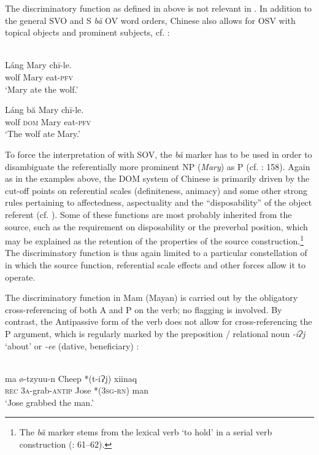 \documentclass[output=paper]{langsci/langscibook}
\begin{document}
The discriminatory function as defined in  above is not relevant in . In addition to the general SVO and S \textit{bă} OV word orders, Chinese also allows for OSV with topical objects and prominent subjects, cf. :

\ea\label{ex:serzant:21}
\\
\ea
\gll Láng   Mary   chī-le.\\
     wolf  Mary  eat-\textsc{pfv}\\
\glt ‘Mary ate the wolf.’

\ex
\gll Láng bă   Mary   chī-le.\\
     wolf \textsc{dom}   Mary  eat-\textsc{pfv}\\
\glt ‘The wolf ate Mary.’
\z
\z

To force the interpretation of  with SOV, the \textit{bă} marker has to be used in order to disambiguate the referentially more prominent NP (\textit{Mary}) as P (cf. \citealt{Bisang1992}: 158). Again as in the examples above, the DOM system of Chinese is primarily driven by the cut-off points on referential scales (definiteness, animacy) and some other strong rules pertaining to affectedness, aspectuality and the “disposability” of the object referent (cf. \citealt{LiThompson1981}). Some of these functions are most probably inherited from the source, such as the requirement on disposability or the preverbal position, which may be explained as the retention of the properties of the source construction.\footnote{The \textit{bă} marker stems from the lexical verb ‘to hold’ in a serial verb construction (\citealt{Sun1996}: 61–62).}  The discriminatory function is thus again limited to a particular constellation of  in which the source function, referential scale effects and other forces allow it to operate.

The discriminatory function in Mam (Mayan) is carried out by the obligatory cross-referencing of both A and P on the verb; no flagging is involved. By contrast, the Antipassive form of the verb does not allow for cross-referencing the P argument, which is regularly marked by the preposition / relational noun \textit{{}-iɁj} ‘about’ or \textit{{}-ee} (dative, beneficiary) \citep[212]{England1983}:

\ea 
{}\\
\gll ma   ø-tzyuu-n   Cheep   *(t-iɁj)   xiinaq\\
     \textsc{rec}   3\textsc{a}{}-grab-\textsc{antip}   Jose   *(3\textsc{sg}{}-\textsc{rn})   man\\
\glt ‘Jose grabbed the man.’
\z
\end{document}
